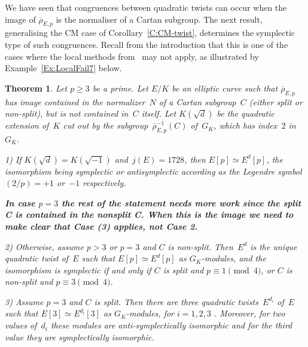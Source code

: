 \documentclass[12pt]{amsart}
\newcommand{\rhobar}{{\overline{\rho}}}
\numberwithin{equation}{section}
\newtheorem{theorem}{Theorem}[section]
\theoremstyle{definition}
\theoremstyle{remark}
\begin{document}
We have seen that congruences between quadratic twists can occur when
the image of $\rhobar_{E,p}$ is the normaliser of a Cartan
subgroup. The next result, generalising the CM case of
Corollary~\ref{C:CM-twist}, determines the symplectic type of such
congruences. Recall from the introduction that this is one of the
cases where the local methods from~\cite{FKSym} may not apply, as
illustrated by Example~\ref{Ex:LocalFail7} below.

\begin{theorem} \label{T:Cartan}
Let $p \geq 3$ be a prime. Let $E/K$ be an elliptic curve such that
$\rhobar_{E,p}$ has image contained in the normalizer~$N$ of a Cartan
subgroup~$C$ (either split or non-split), but is not contained in~$C$
itself.  Let $K(\sqrt{d})$ be the quadratic extension of~$K$ cut out
by the subgroup~$\rhobar_{E,p}^{-1}(C)$ of~$G_K$, which has index~$2$
in~$G_K$.

1) If $K(\sqrt{d})=K(\sqrt{-1})$ and~$j(E)=1728$, then $E[p] \simeq
E^d[p]$, the isomorphism being symplectic or antisymplectic according
as the Legendre symbol $(2/p)=+1$ or~$-1$ respectively.

\textbf{In case $p=3$ the rest of the statement needs more work since
  the split C is contained in the nonsplit C.  When this is the image
  we need to make clear that Case (3) applies, not Case 2.}

2) Otherwise, assume $p > 3$ or $p=3$ and $C$ is non-split.
Then~$E^d$ is the unique quadratic twist of~$E$ such that $E[p] \simeq
E^d[p]$ as $G_K$-modules, and the isomorphism is symplectic if and
only if $C$ is split and $p \equiv 1 \pmod{4}$, or $C$ is non-split
and $p \equiv 3 \pmod{4}$.

3) Assume $p=3$ and $C$ is split. Then there are three quadratic twists~$E^{d_i}$ of~$E$ such 
that $E[3] \simeq E^{d_i}[3]$ as $G_K$-modules, for $i=1,2,3$  . Moreover, for two values of~$d_i$ these modules are anti-symplectically isomorphic and for the third value they are symplectically isomorphic.
\end{theorem}
\end{document}
